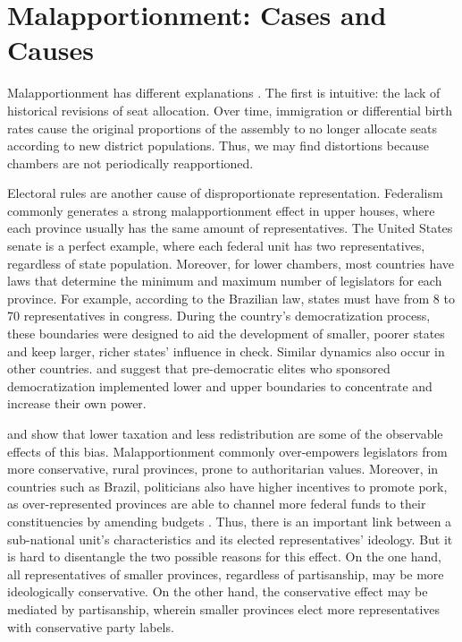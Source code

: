 \documentclass[a4paper,12pt]{article}
\begin{document}
\section{Malapportionment: Cases and Causes}
\label{sec:case}

Malapportionment has different explanations \citep{nicolau1997distorccoes}. The first is intuitive: the lack of historical revisions of seat allocation. Over time, immigration or differential birth rates cause the original proportions of the assembly to no longer allocate seats according to new district populations. Thus, we may find distortions because chambers are not periodically reapportioned. 


Electoral rules are another cause of disproportionate representation. Federalism commonly generates a strong malapportionment effect in upper houses, where each province usually has the same amount of representatives. The United States senate is a perfect example, where each federal unit has two representatives, regardless of state population. Moreover, for lower chambers, most countries have laws that determine the minimum and maximum number of legislators for each province. For example, according to the Brazilian law, states must have from 8 to 70 representatives in congress. During the country's democratization process, these boundaries were designed to aid the development of smaller, poorer states and keep larger, richer states' influence in check. Similar dynamics also occur in other countries. \citet{snyder2001devaluing} and \citet{bruhn2010legislative} suggest that pre-democratic elites who sponsored democratization implemented lower and upper boundaries to concentrate and increase their own power.


\citet{horiuchi2004malapportionment} and \citet{ardanaz2013inequality} show that lower taxation and less redistribution are some of the observable effects of this bias. Malapportionment commonly over-empowers legislators from more conservative, rural provinces, prone to authoritarian values. Moreover, in countries such as Brazil, politicians also have higher incentives to promote pork, as over-represented provinces are able to channel more federal funds to their constituencies by amending budgets \citep{turgeon2014desproporcionalidade}. Thus, there is an important link between a sub-national unit's characteristics and its elected representatives' ideology. But it is hard to disentangle the two possible reasons for this effect. On the one hand, all representatives of smaller provinces, regardless of partisanship, may be more ideologically conservative. On the other hand, the conservative effect may be mediated by partisanship, wherein smaller provinces elect more representatives with conservative party labels. 
\end{document}
